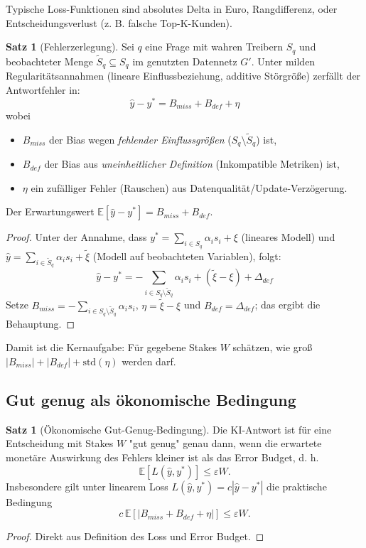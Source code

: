 \documentclass[a4paper,12pt]{article}
\theoremstyle{definition}
\newtheorem{satz}[definition]{Satz}
\newcommand{\E}{\mathbb{E}}
\begin{document}
Typische Loss-Funktionen sind absolutes Delta in Euro, Rangdifferenz, oder Entscheidungsverlust (z. B. falsche Top-K-Kunden).

\begin{satz}[Fehlerzerlegung]
Sei $q$ eine Frage mit wahren Treibern $S_q$ und beobachteter Menge $\tilde S_q\subseteq S_q$ im genutzten Datennetz $G'$. Unter milden Regularitätsannahmen (lineare Einflussbeziehung, additive Störgröße) zerfällt der Antwortfehler in:
\[
\hat y - y^* = B_{miss} + B_{def} + \eta
\]
wobei
\begin{itemize}
\item $B_{miss}$ der Bias wegen \emph{fehlender Einflussgrößen} ($S_q\setminus\tilde S_q$) ist,
\item $B_{def}$ der Bias aus \emph{uneinheitlicher Definition} (Inkompatible Metriken) ist,
\item $\eta$ ein zufälliger Fehler (Rauschen) aus Datenqualität/Update-Verzögerung.
\end{itemize}
Der Erwartungswert $\E[\hat y - y^*] = B_{miss}+B_{def}$.
\end{satz}
\begin{proof}
Unter der Annahme, dass $y^*=\sum_{i\in S_q} \alpha_i s_i + \xi$ (lineares Modell) und $\hat y=\sum_{i\in\tilde S_q}\alpha_i s_i + \tilde\xi$ (Modell auf beobachteten Variablen), folgt:
\[
\hat y-y^*= -\sum_{i\in S_q\setminus\tilde S_q} \alpha_i s_i + (\tilde\xi-\xi) + \Delta_{def}
\]
Setze $B_{miss}=-\sum_{i\in S_q\setminus\tilde S_q}\alpha_i s_i$, $\eta=\tilde\xi-\xi$ und $B_{def}=\Delta_{def}$; das ergibt die Behauptung.
\end{proof}

Damit ist die Kernaufgabe: Für gegebene Stakes $W$ schätzen, wie groß $|B_{miss}|+|B_{def}|+\mathrm{std}(\eta)$ werden darf.

\subsection{Gut genug als ökonomische Bedingung}
\begin{satz}[Ökonomische Gut-Genug-Bedingung]
Die KI-Antwort ist für eine Entscheidung mit Stakes $W$ "gut genug" genau dann, wenn die erwartete monetäre Auswirkung des Fehlers kleiner ist als das Error Budget, d. h.
\[
\E[L(\hat y,y^*)] \le \varepsilon W.
\]
Insbesondere gilt unter linearem Loss $L(\hat y,y^*)=c|\hat y-y^*|$ die praktische Bedingung
\[
c\,\E[|B_{miss}+B_{def}+\eta|] \le \varepsilon W.
\]
\end{satz}
\begin{proof}
Direkt aus Definition des Loss und Error Budget.
\end{proof}
\end{document}
